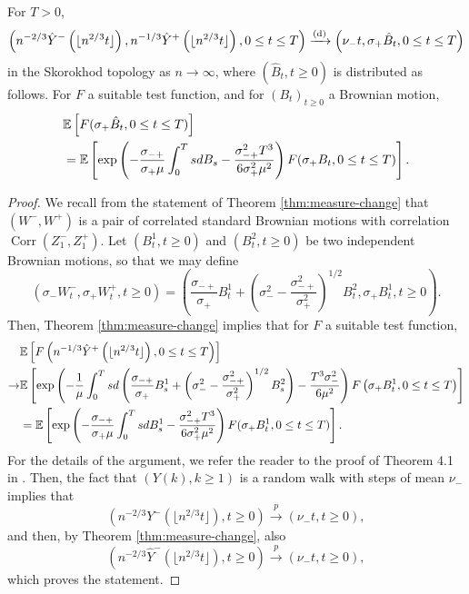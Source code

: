 \begin{theorem}\label{theorem.convaftermeasurechange} 
 For $T>0$,
$$\left(n^{-2/3}\hat{Y}^-\left(\lfloor n^{2/3} t\rfloor\right), n^{-1/3}\hat{Y}^+\left(\lfloor  n^{2/3} t\rfloor\right), 0\leq t \leq T \right) \xrightarrow[]{\mathrm{(d)}} \left( \nu_- t, \sigma_+\hat{B}_t, 0 \leq t \leq T \right)$$
in the Skorokhod topology as $n\to \infty$, where $(\hat{B}_t, t\geq 0)$ is distributed as follows.
For $F$ a suitable test function, and for $(B_t)_{t\geq 0}$ a Brownian motion,
\begin{align*} &{\mathbb E}\left[F(\sigma_+ \hat{B}_t,0\leq t \leq T)\right]\\&={\mathbb E}\left[\exp\left(-\frac{\sigma_{-+}}{\sigma_+ \mu} \int_0^T s dB_s -\frac{\sigma_{-+}^2 T^3}{6\sigma_+^2 \mu^2}\right)F(\sigma_+ B_t,   0\leq t \leq T)\right].\end{align*}

\end{theorem}
\begin{proof}
 We recall from the statement of Theorem \ref{thm:measure-change} that $(W^-,W^+)$ is a pair of correlated standard Brownian motions with correlation $\operatorname{Corr}(Z_1^-,Z_1^+)$. 
Let $(B^1_t,t\geq 0)$ and $(B^2_t,t\geq 0)$ be two independent Brownian motions, so that we may define $$(\sigma_-W^-_t,\sigma_+W^+_t,t\geq 0)=\left(\frac{\sigma_{-+}}{\sigma_+}B_t^1+\left(\sigma_-^2-\frac{\sigma_{-+}^2}{\sigma_+^2}\right)^{1/2} B_t^2, \sigma_+ B_t^1, t\geq 0\right).$$ 
 Then, Theorem \ref{thm:measure-change} implies that for $F$ a suitable test function, 
 \begin{align*}&\E\left[F\left(n^{-1/3}\hat{Y}^+\left(\lfloor n^{2/3}t\rfloor\right), 0\leq t \leq T \right) \right]\\\to& \E\left[\exp\left(-\frac{1}{\mu}\int_0^Tsd\left(\frac{\sigma_{-+}}{\sigma_+}B_s^1+\left(\sigma_-^2-\frac{\sigma_{-+}^2}{\sigma_+^2}\right)^{1/2}B_s^2\right) - \frac{T^3 \sigma_-^2}{6\mu^2}\right) F\left(\sigma_+ B_t^1, 0\leq t \leq T\right)\right]\\
 &=\E\left[\exp\left(-\frac{\sigma_{-+}}{\sigma_+ \mu} \int_0^T s dB^1_s -\frac{\sigma_{-+}^2 T^3}{6\sigma_+^2 \mu^2}\right)F(\sigma_+ B^1_t,   0\leq t \leq T)\right].\end{align*}
 For the details of the argument, we refer the reader to the proof of Theorem 4.1 in \cite{conchon--kerjanStableGraphMetric2020}. Then, the fact that $(Y(k),k\geq 1)$ is a random walk with steps of mean $\nu_-$ implies that
 $$\left(n^{-2/3}Y^-\left(\lfloor n^{2/3}t\rfloor\right),t\geq 0\right)\overset{p}{\to}\left(\nu_- t,t\geq 0\right),$$
 and then, by Theorem \ref{thm:measure-change}, also 
 $$\left(n^{-2/3}\hat{Y}^-\left(\lfloor n^{2/3}t\rfloor\right),t\geq 0\right)\overset{p}{\to}\left(\nu_- t,t\geq 0\right),$$
 which proves the statement.
 \end{proof}
